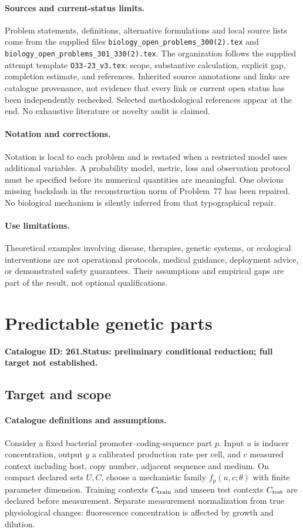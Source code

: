 \documentclass[11pt]{article}
\begin{document}
\paragraph{Sources and current-status limits.}
Problem statements, definitions, alternative formulations and local source lists
come from the supplied files
\texttt{biology\_open\_problems\_300(2).tex} and
\texttt{biology\_open\_problems\_301\_330(2).tex}.
The organization follows the supplied attempt template
\texttt{O33-23\_v3.tex}: scope, substantive calculation, explicit gap,
completion estimate, and references. Inherited source annotations and links are
catalogue provenance, not evidence that every link or current open status has
been independently rechecked. Selected methodological references appear at the
end. No exhaustive literature or novelty audit is claimed.

\paragraph{Notation and corrections.}
Notation is local to each problem and is restated when a restricted model uses
additional variables. A probability model, metric, loss and observation protocol
must be specified before its numerical quantities are meaningful. One obvious
missing backslash in the reconstruction norm of Problem~77 has been repaired.
No biological mechanism is silently inferred from that typographical repair.

\paragraph{Use limitations.}
Theoretical examples involving disease, therapies, genetic systems, or ecological
interventions are not operational protocols, medical guidance, deployment advice,
or demonstrated safety guarantees. Their assumptions and empirical gaps are part
of the result, not optional qualifications.

\setcounter{section}{260}
\section{Predictable genetic parts}
\label{prob:261}
\noindent\textbf{Catalogue ID: 261.}\quad \textbf{Status: preliminary conditional reduction; full target not established.}
\subsection{Target and scope}
\paragraph{Catalogue definitions and assumptions.}
Consider a fixed bacterial promoter--coding-sequence part $p$. Input $u$ is inducer concentration, output $y$ a calibrated production rate per cell, and $c$ measured context including host, copy number, adjacent sequence and medium. On compact declared sets $U,C$, choose a mechanistic family $f_p(u,c;\theta)$ with finite parameter dimension. Training contexts $C_{\rm train}$ and unseen test contexts $C_{\rm test}$ are declared before measurement. Separate measurement normalization from true physiological changes: fluorescence concentration is affected by growth and dilution.
\end{document}
